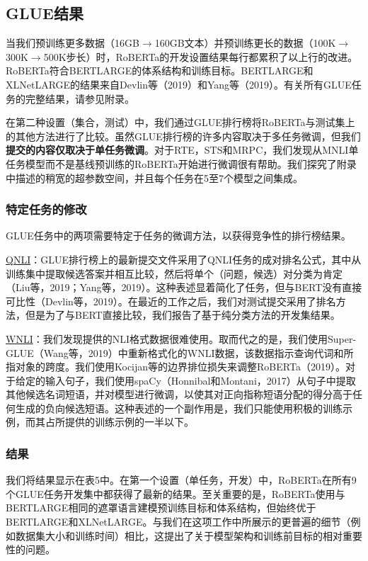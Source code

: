 \documentclass[lang=cn,11pt,a4paper,twocolumn]{elegantpaper}
\begin{document}
\subsection{GLUE结果}
当我们预训练更多数据（16GB$\rightarrow$160GB文本）并预训练更长的数据（100K$\rightarrow$300K$\rightarrow$500K步长）时，RoBERTa的开发设置结果每行都累积了以上行的改进。RoBERTa符合BERTLARGE的体系结构和训练目标。BERTLARGE和XLNetLARGE的结果来自Devlin等（2019）和Yang等（2019）。有关所有GLUE任务的完整结果，请参见附录。

在第二种设置（集合，测试）中，我们通过GLUE排行榜将RoBERTa与测试集上的其他方法进行了比较。虽然GLUE排行榜的许多内容取决于多任务微调，但我们\textbf{提交的内容仅取决于单任务微调}。对于RTE，STS和MRPC，我们发现从MNLI单任务模型而不是基线预训练的RoBERTa开始进行微调很有帮助。我们探究了附录中描述的稍宽的超参数空间，并且每个任务在5至7个模型之间集成。

\subsubsection*{特定任务的修改}
GLUE任务中的两项需要特定于任务的微调方法，以获得竞争性的排行榜结果。

\underline{QNLI}：GLUE排行榜上的最新提交文件采用了QNLI任务的成对排名公式，其中从训练集中提取候选答案并相互比较，然后将单个（问题，候选）对分类为肯定（Liu等，2019；Yang等，2019）。这种表述显着简化了任务，但与BERT没有直接可比性（Devlin等，2019）。在最近的工作之后，我们对测试提交采用了排名方法，但是为了与BERT直接比较，我们报告了基于纯分类方法的开发集结果。

\underline{WNLI}：我们发现提供的NLI格式数据很难使用。取而代之的是，我们使用Super-GLUE（Wang等，2019）中重新格式化的WNLI数据，该数据指示查询代词和所指对象的跨度。我们使用Kocijan等的边界排位损失来调整RoBERTa（2019）。对于给定的输入句子，我们使用spaCy（Honnibal和Montani，2017）从句子中提取其他候选名词短语，并对模型进行微调，以使其对正向指称短语分配的得分高于任何生成的负向候选短语。这种表述的一个副作用是，我们只能使用积极的训练示例，而其占所提供的训练示例的一半以下。

\subsubsection*{结果}
我们将结果显示在表5中。在第一个设置（单任务，开发）中，RoBERTa在所有9个GLUE任务开发集中都获得了最新的结果。至关重要的是，RoBERTa使用与BERTLARGE相同的遮罩语言建模预训练目标和体系结构，但始终优于BERTLARGE和XLNetLARGE。与我们在这项工作中所展示的更普遍的细节（例如数据集大小和训练时间）相比，这提出了关于模型架构和训练前目标的相对重要性的问题。
\end{document}
